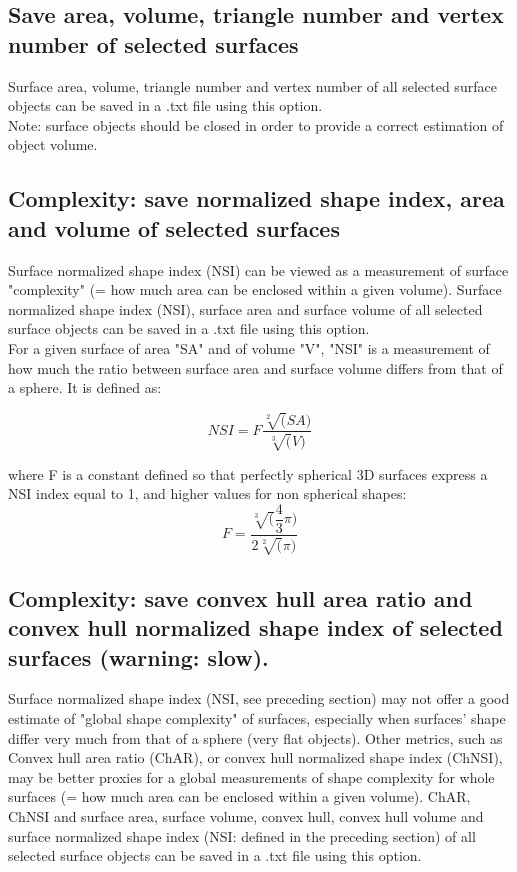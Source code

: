 \subsection{Save area, volume, triangle number and vertex number of selected surfaces}
\noindent
Surface area, volume, triangle number and vertex number of all selected surface objects can be saved in a .txt file using this option.\\
\noindent Note: surface objects should be closed in order to provide a correct estimation of object volume.

\subsection{Complexity: save normalized shape index, area and volume of selected surfaces} \label{global_complexity_1}
\noindent
Surface normalized shape index (NSI) can be viewed as a measurement of surface "complexity" (= how much area can be enclosed within a given volume). Surface normalized shape index (NSI), surface area and surface volume of all selected surface objects can be saved in a .txt file using this option.\\
For a given surface of area "SA" and of volume "V", "NSI" is a measurement of how much the ratio between surface area and surface volume differs from that of a sphere. It is defined as: 

\begin{equation}
NSI = F \dfrac{\sqrt[2](SA)}{\sqrt[3](V)}
\end{equation}

where F is a constant defined so that perfectly spherical 3D surfaces express a NSI index equal to 1, and higher values for non spherical shapes:
\begin{equation}
F = \dfrac{\sqrt[3](\dfrac{4}{3}\pi)}{2\sqrt[2](\pi)}
\end{equation}

\subsection{Complexity: save convex hull area ratio and convex hull normalized shape index of selected surfaces (warning: slow).} \label{global_complexity_2}
\noindent
Surface normalized shape index (NSI, see preceding section) may not offer a good estimate of "global shape complexity" of surfaces, especially when surfaces' shape differ very much from that of a sphere (very flat objects).  
Other metrics, such as Convex hull area ratio (ChAR), or convex hull normalized shape index (ChNSI), may be better proxies for a global measurements of shape complexity for whole surfaces (= how much area can be enclosed within a given volume). 
 ChAR, ChNSI and surface area, surface volume, convex hull, convex hull volume and surface normalized shape index (NSI: defined in the preceding section) of all selected surface objects can be saved in a .txt file using this option.\\

